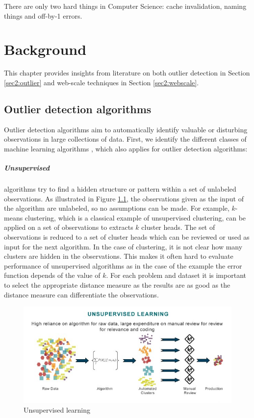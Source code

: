 \begin{savequote}[150mm] 
There are only two hard things in Computer Science: cache invalidation, naming things and off-by-1 errors. 
\end{savequote}

\chapter{Background \label{chap2:background}}
This chapter provides insights from literature on both outlier detection in Section \ref{sec2:outlier} and web-scale techniques in Section \ref{sec2:webscale}.

\section{Outlier detection algorithms \label{sec2:outlier}}
Outlier detection algorithms aim to automatically identify valuable or disturbing observations in large collections of data. First, we identify the different classes of machine learning algorithms \cite{Fayyad:1996:DMK:257938.257942}, which also applies for outlier detection algorithms:

\paragraph{Unsupervised} algorithms try to find a hidden structure or pattern within a set of unlabeled observations. As illustrated in Figure \ref{fig:unsupervised}, the observations given as the input of the algorithm are unlabeled, so no assumptions can be made. For example, $k$-means clustering, which is a classical example of unsupervised clustering, can be applied on a set of observations to extracts $k$ cluster heads. The set of observations is reduced to a set of cluster heads which can be reviewed or used as input for the next algorithm. In the case of clustering, it is not clear how many clusters are hidden in the observations. This makes it often hard to evaluate performance of unsupervised algorithms as in the case of the example the error function depends of the value of $k$. For each problem and dataset it is important to select the appropriate distance measure as the results are as good as the distance measure can differentiate the observations.

\begin{figure}[ht!]
\centering
\includegraphics[width=\textwidth]{figures/unsupervised.jpg}
\caption{Unsupervised learning}
\label{fig:unsupervised}
\end{figure}

